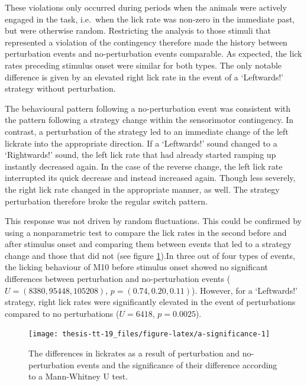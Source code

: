 \documentclass[]{report}
\theoremstyle{definition}
\theoremstyle{definition}
\theoremstyle{definition}
\theoremstyle{remark}
\begin{document}
These violations only occurred during periods when the animals were
actively engaged in the task, i.e.~when the lick rate was non-zero in
the immediate past, but were otherwise random. Restricting the analysis
to those stimuli that represented a violation of the contingency
therefore made the history between perturbation events and
no-perturbation events comparable. As expected, the lick rates preceding
stimulus onset were similar for both types. The only notable difference
is given by an elevated right lick rate in the event of a `Leftwards!'
strategy without perturbation.

The behavioural pattern following a no-perturbation event was consistent
with the pattern following a strategy change within the sensorimotor
contingency. In contrast, a perturbation of the strategy led to an
immediate change of the left lickrate into the appropriate direction. If
a `Leftwards!' sound changed to a `Rightwards!' sound, the left lick
rate that had already started ramping up instantly decreased again. In
the case of the reverse change, the left lick rate interrupted its quick
decrease and instead increased again. Though less severely, the right
lick rate changed in the appropriate manner, as well. The strategy
perturbation therefore broke the regular switch pattern.

This response was not driven by random fluctuations. This could be
confirmed by using a nonparametric test to compare the lick rates in the
second before and after stimulus onset and comparing them between events
that led to a strategy change and those that did not (see figure
\ref{fig:a-significance}).In three out of four types of events, the
licking behaviour of M10 before stimulus onset showed no significant
differences between perturbation and no-perturbation events
(\(U=(8380, 95448, 105208)\), \(p = (0.74, 0.20, 0.11)\)). However, for
a `Leftwards!' strategy, right lick rates were significantly elevated in
the event of perturbations compared to no perturbations (\(U=6418\),
\(p=0.0025\)).

\begin{figure}

{\centering \texttt{[image: thesis-tt-19\_files/figure-latex/a-significance-1]} 

}

\caption{The differences in lickrates as a result of
perturbation and no-perturbation events and the significance of their
difference according to a Mann-Whitney U test.}\label{fig:a-significance}
\end{figure}
\end{document}
